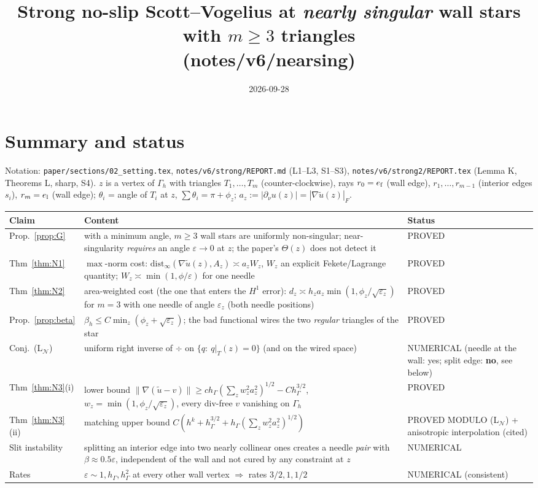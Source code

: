 \documentclass[11pt]{article}
\title{Strong no-slip Scott--Vogelius at \emph{nearly singular} wall stars with $m\ge3$ triangles\\ (notes/v6/nearsing)}
\date{2026-09-28}
\theoremstyle{remark}
\newcommand{\hG}{h_\Gamma}
\newcommand{\dn}{\partial_\nu}
\newcommand{\norm}[1]{\|#1\|}
\newcommand{\Nset}{\mathcal N}
\begin{document}
\sloppy
\maketitle

\section*{Summary and status}
Notation: \texttt{paper/sections/02\_setting.tex}, \texttt{notes/v6/strong/REPORT.md} (L1--L3, S1--S3),
\texttt{notes/v6/strong2/REPORT.tex} (Lemma K, Theorems L, sharp, S4). $z$ is a vertex of $\Gamma_h$ with triangles
$T_1,\dots,T_m$ (counter-clockwise), rays $r_0=e_{\rm f}$ (wall edge), $r_1,\dots,r_{m-1}$ (interior edges $s_i$),
$r_m=e_{\rm l}$ (wall edge); $\theta_i$ = angle of $T_i$ at $z$, $\sum\theta_i=\pi+\phi_z$; $a_z:=|\dn u(z)|=|\nabla\tilde u(z)|_F$.

\begin{center}\small\begin{tabular}{p{2.5cm}p{9.4cm}p{2.9cm}}
\toprule
Claim & Content & Status\\\midrule
Prop.~\ref{prop:G} & with a minimum angle, $m\ge3$ wall stars are uniformly non-singular; near-singularity \emph{requires} an angle $\varepsilon\to0$ at $z$; the paper's $\Theta(z)$ does not detect it & PROVED\\
Thm~\ref{thm:N1} & $\max$-norm cost: $\mathrm{dist}_\infty(\nabla\tilde u(z),A_z)\asymp a_zW_z$, $W_z$ an explicit Fekete/Lagrange quantity; $W_z\asymp\min(1,\phi/\varepsilon)$ for one needle & PROVED\\
Thm~\ref{thm:N2} & area-weighted cost (the one that enters the $H^1$ error): $d_z\asymp h_za_z\min(1,\phi_z/\sqrt{\varepsilon_z})$ for $m=3$ with one needle of angle $\varepsilon_z$ (both needle positions) & PROVED\\
Prop.~\ref{prop:beta} & $\beta_h\le C\min_z(\phi_z+\sqrt{\varepsilon_z})$; the bad functional wires the two \emph{regular} triangles of the star & PROVED\\
Conj.~(L$_\Nset$) & uniform right inverse of $\div$ on $\{q:\ q|_T(z)=0\}$ (and on the wired space) & NUMERICAL (needle at the wall: yes; split edge: \textbf{no}, see below)\\
Thm~\ref{thm:N3}(i) & lower bound $\norm{\nabla(\tilde u-v)}\ge c\hG(\sum_z w_z^2a_z^2)^{1/2}-C\hG^{3/2}$, $w_z=\min(1,\phi_z/\sqrt{\varepsilon_z})$, every div-free $v$ vanishing on $\Gamma_h$ & PROVED\\
Thm~\ref{thm:N3}(ii) & matching upper bound $C(h^k+\hG^{3/2}+\hG(\sum_zw_z^2a_z^2)^{1/2})$ & PROVED MODULO (L$_\Nset$) + anisotropic interpolation (cited)\\
Slit instability & splitting an interior edge into two nearly collinear ones creates a needle \emph{pair} with $\beta\approx0.5\varepsilon$, independent of the wall and not cured by any constraint at $z$ & NUMERICAL\\
Rates & $\varepsilon\sim1,\hG,\hG^2$ at every other wall vertex $\Rightarrow$ rates $3/2,1,1/2$ & NUMERICAL (consistent)\\
\bottomrule\end{tabular}\end{center}
\end{document}
